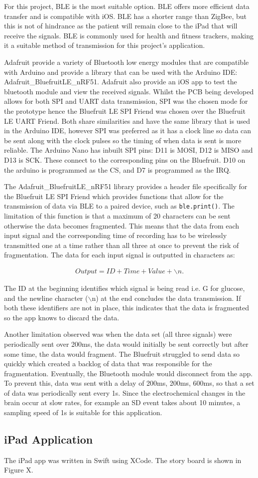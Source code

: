 For this project, BLE is the most suitable option. BLE offers more efficient data transfer and is compatible with iOS. BLE has a shorter range than ZigBee, but this is not of hindrance as the patient will remain close to the iPad that will receive the signals. BLE is commonly used for health and fitness trackers, making it a suitable method of transmission for this project's application.

Adafruit provide a variety of Bluetooth low energy modules that are compatible with Arduino and provide a library that can be used with the Arduino IDE: Adafruit\_BluefruitLE\_nRF51. Adafruit also provide an iOS app to test the bluetooth module and view the received signals. Whilst the PCB being developed allows for both SPI and UART data transmission, SPI was the chosen mode for the prototype hence the Bluefruit LE SPI Friend was chosen over the Bluefruit LE UART Friend. Both share similarities and have the same library that is used in the Arduino IDE, however SPI was preferred as it has a clock line so data can be sent along with the clock pulses so the timing of when data is sent is more reliable. The Arduino Nano has inbuilt SPI pins: D11 is MOSI, D12 is MISO and D13 is SCK. These connect to the corresponding pins on the Bluefruit. D10 on the arduino is programmed as the CS, and D7 is programmed as the IRQ. 

The Adafruit\_BluefruitLE\_nRF51 library provides a header file specifically for the Bluefruit LE SPI Friend which provides functions that allow for the transmission of data via BLE to a paired device, such as {\tt{ble.print()}}. The limitation of this function is that a maximum of 20 characters can be sent otherwise the data becomes fragmented. This means that the data from each input signal and the corresponding time of recording has to be wirelessly transmitted one at a time rather than all three at once to prevent the risk of fragmentation. The data for each input signal is outputted in characters as:

\begin{align}
    Output = ID + Time + Value + \backslash n.
    \nonumber
\end{align}

The ID at the beginning identifies which signal is being read i.e. G for glucose, and the newline character ($\backslash$n) at the end concludes the data transmission. If both these identifiers are not in place, this indicates that the data is fragmented so the app knows to discard the data. 

Another limitation observed was when the data set (all three signals) were periodically sent over 200ms, the data would initially be sent correctly but after some time, the data would fragment. The Bluefruit struggled to send data so quickly which created a backlog of data that was responsible for the fragmentation. Eventually, the Bluetooth module would disconnect from the app. To prevent this, data was sent with a delay of 200ms, 200ms, 600ms, so that a set of data was periodically sent every 1s. Since the electrochemical changes in the brain occur at slow rates, for example an SD event takes about 10 minutes, a sampling speed of 1s is suitable for this application. 





\subsection{iPad Application}
The iPad app was written in Swift using XCode. The story board is shown in Figure X.
